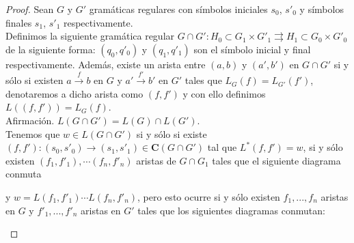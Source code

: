 \documentclass[../main.tex]{subfiles}
\begin{document}
 \begin{proof}
   	Sean $G$ y $G'$ gramáticas regulares con símbolos iniciales $s_0$, $s'_0$ y símbolos finales $s_1$, $s'_1$ respectivamente. \\
	Definimos la siguiente gramática regular $G \cap G': H_0 \subset G_1 \times G'_1 \rightrightarrows H_1 \subset G_0 \times G'_0$ de la siguiente forma: $(q_0,q'_0)$ y $(q_1,q'_1)$ son el símbolo inicial y final respectivamente. Además, existe un arista entre $(a,b)$ y  $(a',b')$ en $G \cap G'$ si y sólo si existen $a \xrightarrow{f} b$ en $G$ y $a' \xrightarrow{f'} b'$ en $G'$ tales que $L_G(f)=L_{G'}(f')$, denotaremos a dicho arista como $(f,f')$ y con ello definimos $L((f,f'))=L_G(f)$. \\
	Afirmación. $L(G \cap G') = L(G) \cap L(G')$. \\
	Tenemos que $w \in L(G \cap G')$ si y sólo si existe $(f,f'):(s_0,s'_0) \to (s_1, s'_1) \in \mathbf{C}(G\cap G')$ tal que $L^*(f,f')=w$, si y sólo existen $(f_1,f'_1), \cdots (f_n,f'_n)$ aristas de $G \cap G_1$ tales que el siguiente diagrama conmuta
	
	 \begin{center}
	\end{center}
 	y $w=L(f_1,f'_1) \cdots L(f_n,f'_n)$, pero esto ocurre si y sólo existen $f_1, ..., f_n$ aristas en $G$ y $f'_1, ..., f'_n$ aristas en $G'$ tales que los siguientes diagramas conmutan: 
 	\begin{multicols}{2}
 		 \begin{center}
 		\end{center}
 		

\end{multicols}
\end{proof}
\end{document}
